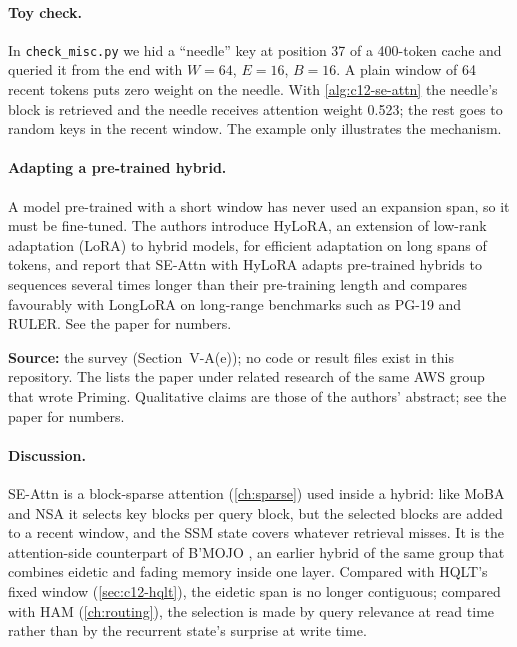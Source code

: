 \paragraph{Toy check.} In \texttt{check\_misc.py} we hid a ``needle'' key at position 37 of a
400-token cache and queried it from the end with $W = 64$, $E = 16$, $B = 16$. A plain window of
64 recent tokens puts zero weight on the needle. With \cref{alg:c12-se-attn} the needle's block is
retrieved and the needle receives attention weight 0.523; the rest goes to random keys in the
recent window. The example only illustrates the mechanism.

\paragraph{Adapting a pre-trained hybrid.} A model pre-trained with a short window has never used
an expansion span, so it must be fine-tuned. The authors introduce HyLoRA, an extension of
low-rank adaptation (LoRA) to hybrid models, for efficient adaptation on long spans of tokens, and
report that SE-Attn with HyLoRA adapts pre-trained hybrids to sequences several times longer than
their pre-training length and compares favourably with LongLoRA on long-range benchmarks such as
PG-19 and RULER. See the paper for numbers.

\begin{results}
\textbf{Source:} the survey (Section~V-A(e)); no code or result files exist in this repository.
The  lists the paper under related research
of the same AWS group that wrote Priming. Qualitative claims are those of the authors' abstract;
see the paper for numbers.
\end{results}

\paragraph{Discussion.} SE-Attn is a block-sparse attention (\cref{ch:sparse}) used inside a hybrid:
like MoBA and NSA it selects key blocks per query block, but the selected blocks are added to a
recent window, and the SSM state covers whatever retrieval misses. It is the attention-side
counterpart of B'MOJO \citep{c12-zancato2024bmojo}, an earlier hybrid of the same group that
combines eidetic and fading memory inside one layer. Compared with HQLT's fixed window
(\cref{sec:c12-hqlt}), the eidetic span is no longer contiguous; compared with HAM
(\cref{ch:routing}), the selection is made by query relevance at read time rather than by the
recurrent state's surprise at write time.

